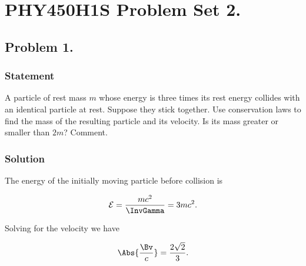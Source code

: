 %


\author{Peeter Joot}

\chapter{PHY450H1S Problem Set 2.}
\label{chap:relElectroDynProblemSet2}
\date{Feb 1, 2011}

\beginArtNoToc
%

\section{Problem 1.}
\subsection{Statement}

A particle of rest mass $m$ whose energy is three times its rest energy collides with an identical particle at rest.  Suppose they stick together.  Use conservation laws to find the mass of the resulting particle and its velocity.  Is its mass greater or smaller than $2m$?  Comment.

\subsection{Solution}

The energy of the initially moving particle before collision is

\begin{equation}\label{eqn:relElectroDynProblemSet2:n}
\mathcal{E} = \frac{m c^2 }{\InvGamma} = 3 m c^2.
\end{equation}

Solving for the velocity we have

\begin{equation}\label{eqn:relElectroDynProblemSet2:n}
\Abs{\frac{\Bv}{c}} = \frac{2 \sqrt{2}}{3}.
\end{equation}

